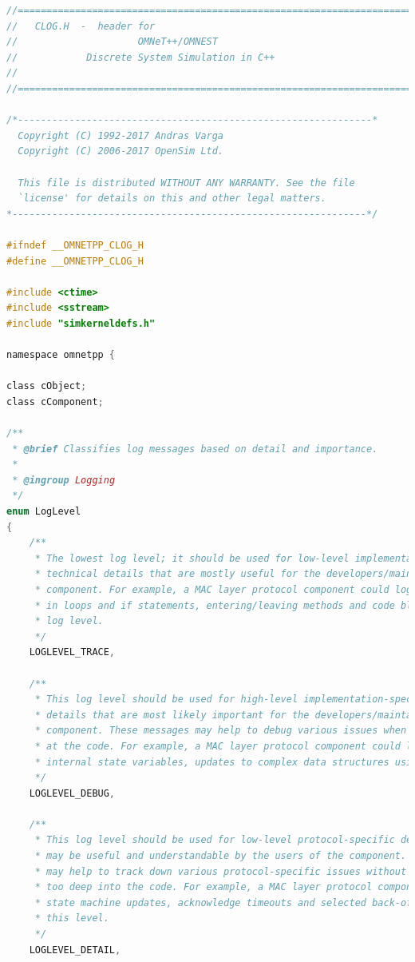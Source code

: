 \begin{lstlisting}[language=c]
//==========================================================================
//   CLOG.H  -  header for
//                     OMNeT++/OMNEST
//            Discrete System Simulation in C++
//
//==========================================================================

/*--------------------------------------------------------------*
  Copyright (C) 1992-2017 Andras Varga
  Copyright (C) 2006-2017 OpenSim Ltd.

  This file is distributed WITHOUT ANY WARRANTY. See the file
  `license' for details on this and other legal matters.
*--------------------------------------------------------------*/

#ifndef __OMNETPP_CLOG_H
#define __OMNETPP_CLOG_H

#include <ctime>
#include <sstream>
#include "simkerneldefs.h"

namespace omnetpp {

class cObject;
class cComponent;

/**
 * @brief Classifies log messages based on detail and importance.
 *
 * @ingroup Logging
 */
enum LogLevel
{
    /**
     * The lowest log level; it should be used for low-level implementation-specific
     * technical details that are mostly useful for the developers/maintainers of the
     * component. For example, a MAC layer protocol component could log control flow
     * in loops and if statements, entering/leaving methods and code blocks using this
     * log level.
     */
    LOGLEVEL_TRACE,

    /**
     * This log level should be used for high-level implementation-specific technical
     * details that are most likely important for the developers/maintainers of the
     * component. These messages may help to debug various issues when one is looking
     * at the code. For example, a MAC layer protocol component could log updates to
     * internal state variables, updates to complex data structures using this log level.
     */
    LOGLEVEL_DEBUG,

    /**
     * This log level should be used for low-level protocol-specific details that
     * may be useful and understandable by the users of the component. These messages
     * may help to track down various protocol-specific issues without actually looking
     * too deep into the code. For example, a MAC layer protocol component could log
     * state machine updates, acknowledge timeouts and selected back-off periods using
     * this level.
     */
    LOGLEVEL_DETAIL,


\end{lstlisting}

